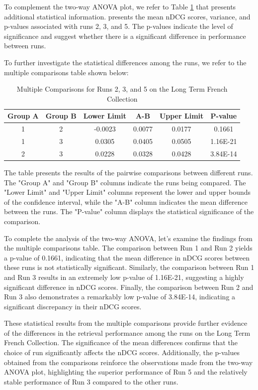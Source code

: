 To complement the two-way \ac{ANOVA} plot, we refer to Table \ref{table:lt_anova_french} that presents additional statistical information.
presents the mean \ac{nDCG} scores, variance, and p-values associated with runs 2, 3, and 5. 
The p-values indicate the level of significance and suggest whether there is a significant difference in performance between runs.

To further investigate the statistical differences among the runs, we refer to the multiple comparisons table shown below:

\begin{table}[!h]
\centering
\caption{Multiple Comparisons for Runs 2, 3, and 5 on the Long Term French Collection}
\label{table:lt_anova_french}
\begin{tabular}{cccccc}
\hline
Group A & Group B & Lower Limit & A-B & Upper Limit & P-value \\ \hline
1 & 2 & -0.0023 & 0.0077 & 0.0177 & 0.1661 \\
1 & 3 & 0.0305 & 0.0405 & 0.0505 & 1.16E-21 \\
2 & 3 & 0.0228 & 0.0328 & 0.0428 & 3.84E-14 \\ \hline
\end{tabular}
\end{table}

The table presents the results of the pairwise comparisons between different runs. 
The "Group A" and "Group B" columns indicate the runs being compared. 
The "Lower Limit" and "Upper Limit" columns represent the lower and upper bounds of the confidence interval, while the "A-B" column indicates the mean difference between the runs. 
The "P-value" column displays the statistical significance of the comparison.

To complete the analysis of the two-way \ac{ANOVA}, let's examine the findings from the multiple comparisons table. The comparison between Run 1 and Run 2 yields a p-value of 0.1661, indicating that the mean difference in \ac{nDCG} scores between these runs is not statistically significant. Similarly, the comparison between Run 1 and Run 3 results in an extremely low p-value of 1.16E-21, suggesting a highly significant difference in \ac{nDCG} scores. Finally, the comparison between Run 2 and Run 3 also demonstrates a remarkably low p-value of 3.84E-14, indicating a significant discrepancy in their \ac{nDCG} scores.

These statistical results from the multiple comparisons provide further evidence of the differences in the retrieval performance among the runs on the Long Term French Collection. The significance of the mean differences confirms that the choice of run significantly affects the \ac{nDCG} scores. Additionally, the p-values obtained from the comparisons reinforce the observations made from the two-way \ac{ANOVA} plot, highlighting the superior performance of Run 5 and the relatively stable performance of Run 3 compared to the other runs.

